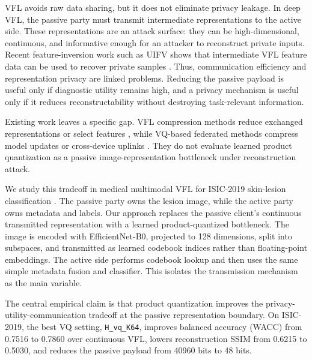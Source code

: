 \documentclass{article}
\begin{document}
VFL avoids raw data sharing, but it does not eliminate privacy leakage. In deep VFL, the passive party must transmit intermediate representations to the active side. These representations are an attack surface: they can be high-dimensional, continuous, and informative enough for an attacker to reconstruct private inputs. Recent feature-inversion work such as UIFV shows that intermediate VFL feature data can be used to recover private samples \citep{yang2024uifv}. Thus, communication efficiency and representation privacy are linked problems. Reducing the passive payload is useful only if diagnostic utility remains high, and a privacy mechanism is useful only if it reduces reconstructability without destroying task-relevant information.

Existing work leaves a specific gap. VFL compression methods reduce exchanged representations or select features \citep{castiglia2022compressedvfl,inoue2023sparsevfl,castiglia2023lessvfl}, while VQ-based federated methods compress model updates or cross-device uplinks \citep{oh2024fedvqcs,yang2024fedmpq}. They do not evaluate learned product quantization as a passive image-representation bottleneck under reconstruction attack.

We study this tradeoff in medical multimodal VFL for ISIC-2019 skin-lesion classification \citep{isic2019challenge,combalia2022isic}. The passive party owns the lesion image, while the active party owns metadata and labels. Our approach replaces the passive client's continuous transmitted representation with a learned product-quantized bottleneck. The image is encoded with EfficientNet-B0, projected to 128 dimensions, split into subspaces, and transmitted as learned codebook indices rather than floating-point embeddings. The active side performs codebook lookup and then uses the same simple metadata fusion and classifier. This isolates the transmission mechanism as the main variable.

The central empirical claim is that product quantization improves the privacy-utility-communication tradeoff at the passive representation boundary. On ISIC-2019, the best VQ setting, \texttt{H\_vq\_K64}, improves balanced accuracy (WACC) from 0.7516 to 0.7860 over continuous VFL, lowers reconstruction SSIM from 0.6215 to 0.5030, and reduces the passive payload from 40960 bits to 48 bits.
\end{document}
